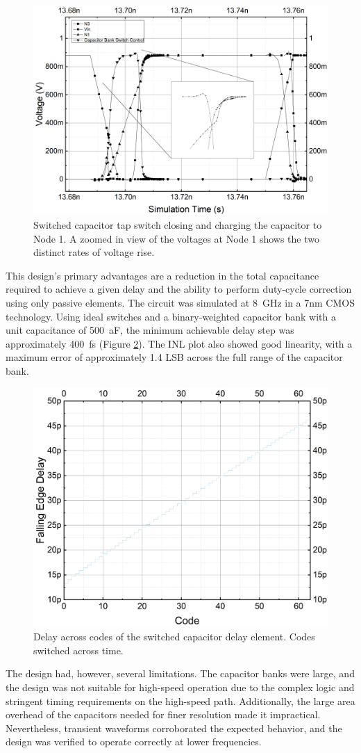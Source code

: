 \begin{figure}[H]
  \centering
  \includegraphics[width=0.5\linewidth]{figures/Results/SCI-SwitchVoltageAndLoadingTime.png}
  \caption{Switched capacitor tap switch closing and charging the capacitor to Node 1. A zoomed in view of the voltages at Node 1 shows the two distinct rates of voltage rise.}
  \label{fig:switched_cap_charging_cap_switch}
\end{figure}

This design's primary advantages are a reduction in the total capacitance required to achieve a given delay and the ability to perform duty-cycle correction using only passive elements. The circuit was simulated at \SI{8}{\giga\hertz} in a 7nm CMOS technology. Using ideal switches and a binary-weighted capacitor bank with a unit capacitance of \SI{500}{\atto\farad}, the minimum achievable delay step was approximately \SI{400}{\femto\second} (Figure \ref{fig:SCI_delayacrosscodes}). The INL plot also showed good linearity, with a maximum error of approximately 1.4 LSB across the full range of the capacitor bank.

\begin{figure}[H]
  \centering
  \includegraphics[width=0.5\linewidth]{figures/Results/SCI-FallingEdgeDelay.png}
  \caption{Delay across codes of the switched capacitor delay element. Codes switched across time.}
  \label{fig:SCI_delayacrosscodes}
\end{figure}

The design had, however, several limitations. The capacitor banks were large, and the design was not suitable for high-speed operation due to the complex logic and stringent timing requirements on the high-speed path. Additionally, the large area overhead of the capacitors needed for finer resolution made it impractical. Nevertheless, transient waveforms corroborated the expected behavior, and the design was verified to operate correctly at lower frequencies. 

